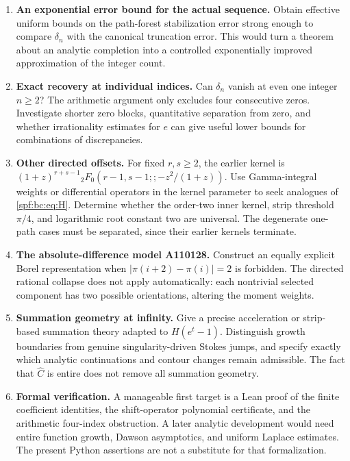 \documentclass[11pt]{article}
\numberwithin{equation}{section}
\theoremstyle{definition}
\theoremstyle{remark}
\theoremstyle{definition}
\begin{document}
\begin{enumerate}[label=\textbf{Q\arabic*.},leftmargin=*]
\item \textbf{An exponential error bound for the actual sequence.}
Obtain effective uniform bounds on the path-forest stabilization error strong
enough to compare $\delta_n$ with the canonical truncation error. This would
turn a theorem about an analytic completion into a controlled exponentially
improved approximation of the integer count.

\item \textbf{Exact recovery at individual indices.}
Can $\delta_n$ vanish at even one integer $n\ge2$? The arithmetic argument
only excludes four consecutive zeros. Investigate shorter zero blocks,
quantitative separation from zero, and whether irrationality estimates for
$e$ can give useful lower bounds for combinations of discrepancies.

\item \textbf{Other directed offsets.}
For fixed $r,s\ge2$, the earlier kernel is
$(1+z)^{r+s-1}{}_2F_0(r-1,s-1;;-z^2/(1+z))$.
Use Gamma-integral weights or differential operators in the kernel parameter
to seek analogues of \eqref{spf:bc:eq:H}. Determine whether the order-two inner
kernel, strip threshold $\pi/4$, and logarithmic root constant two are universal.
The degenerate one-path cases must be separated, since their earlier kernels
terminate.

\item \textbf{The absolute-difference model A110128.}
Construct an equally explicit Borel representation when
$|\pi(i+2)-\pi(i)|=2$ is forbidden. The directed rational collapse does not
apply automatically: each nontrivial selected component has two possible
orientations, altering the moment weights.

\item \textbf{Summation geometry at infinity.}
Give a precise acceleration or strip-based summation theory adapted to
$H(e^t-1)$. Distinguish growth boundaries from genuine singularity-driven
Stokes jumps, and specify exactly which analytic continuations and contour
changes remain admissible. The fact that $\widehat C$ is entire does not remove
all summation geometry.

\item \textbf{Formal verification.}
A manageable first target is a Lean proof of the finite coefficient
identities, the shift-operator polynomial certificate, and the arithmetic
four-index obstruction. A later analytic development would need entire
function growth, Dawson asymptotics, and uniform Laplace estimates. The
present Python assertions are not a substitute for that formalization.
\end{enumerate}
\end{document}
